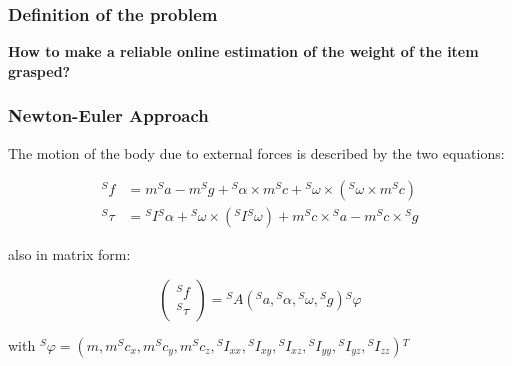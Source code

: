 \documentclass[usenames,dvipsnames]{beamer}
\begin{document}
\begin{frame}
  \frametitle{Definition of the problem}
  \center
  {\Huge \textbf{How to make a reliable online estimation of the weight of the item grasped?}}
\end{frame}

\begin{frame}
 \frametitle{Newton-Euler Approach}

 The motion of the body due to external forces is described by the two equations:

 \begin{align}
  {}^S f    & = m {}^S a - m {}^S g + {}^S \alpha \times m {}^S c + {}^S \omega \times ({}^S \omega \times m {}^S c)           \\
  {}^S \tau & = {}^S I {}^S \alpha + {}^S \omega \times ({}^S I {}^S \omega) + m {}^S c \times {}^S a - m {}^S c \times {}^S g
 \end{align}

 also in matrix form:

 \begin{equation}
  \begin{pmatrix}
   {}^S f    \\
   {}^S \tau
  \end{pmatrix}
  = {}^S A({}^S a, {}^S \alpha, {}^S \omega, {}^S g) {}^S \varphi
 \end{equation}

 with ${}^S \varphi = (m, m {}^S c_x, m {}^S c_y, m {}^S c_z, {}^S I_{xx}, {}^S I_{xy}, {}^S I_{xz}, {}^S I_{yy}, {}^S I_{yz}, {}^S I_{zz}) {}^T$
\end{frame}
\end{document}
